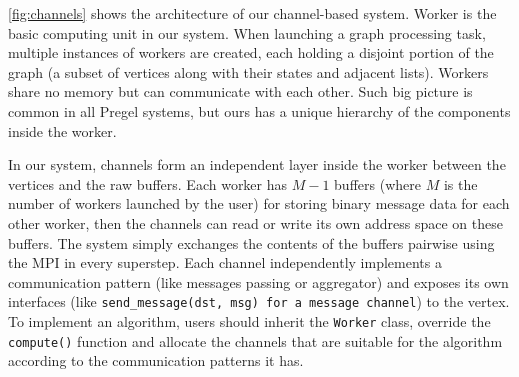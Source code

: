\documentclass{sokendai_thesis} %
\newcommand{\PP}{Pregel+}
\begin{document}
\autoref{fig:channels} shows the architecture of our channel-based system.
Worker is the basic computing unit in our system.
When launching a graph processing task, multiple instances of workers are created, each holding a disjoint portion of the graph (a subset of vertices along with their states and adjacent lists).
Workers share no memory but can communicate with each other.
Such big picture is common in all Pregel systems, but ours has a unique hierarchy of the components inside the worker.

In our system, channels form an independent layer inside the worker between the vertices and the raw buffers.
Each worker has $M-1$ buffers (where $M$ is the number of workers launched by the user) for storing binary message data for each other worker,
then the channels can read or write its own address space on these buffers.
The system simply exchanges the contents of the buffers pairwise using the MPI in every superstep.
Each channel independently implements a communication pattern (like messages passing or aggregator) and exposes its own interfaces (like \texttt{send\_message(dst, msg) for a message channel}) to the vertex.
To implement an algorithm, users should inherit the \texttt{Worker} class, override the \texttt{compute()} function and allocate the channels that are suitable for the algorithm according to the communication patterns it has.

\end{document}

